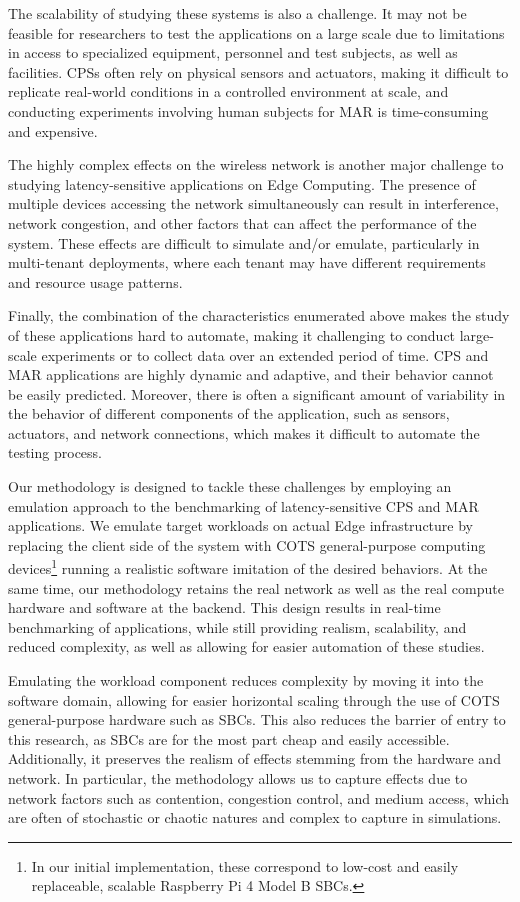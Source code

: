 The scalability of studying these systems is also a challenge.
It may not be feasible for researchers to test the applications on a large scale due to limitations in access to specialized equipment, personnel and test subjects, as well as facilities.
\glspl{CPS} often rely on physical sensors and actuators, making it difficult to replicate real-world conditions in a controlled environment at scale, and conducting experiments involving human subjects for \gls{MAR} is time-consuming and expensive.

The highly complex effects on the wireless network is another major challenge to studying latency-sensitive applications on Edge Computing.
The presence of multiple devices accessing the network simultaneously can result in interference, network congestion, and other factors that can affect the performance of the system.
These effects are difficult to simulate and/or emulate, particularly in multi-tenant deployments, where each tenant may have different requirements and resource usage patterns.

Finally, the combination of the characteristics enumerated above makes the study of these applications hard to automate, making it challenging to conduct large-scale experiments or to collect data over an extended period of time.
\gls{CPS} and \gls{MAR} applications are highly dynamic and adaptive, and their behavior cannot be easily predicted.
Moreover, there is often a significant amount of variability in the behavior of different components of the application, such as sensors, actuators, and network connections, which makes it difficult to automate the testing process.

Our methodology is designed to tackle these challenges by employing an emulation approach to the benchmarking of latency-sensitive \gls{CPS} and \gls{MAR} applications. 
We emulate target workloads on actual Edge infrastructure by replacing the client side of the system with \gls{COTS} general-purpose computing devices\footnote{%
    In our initial implementation, these correspond to low-cost and easily replaceable, scalable Raspberry Pi 4 Model B \acsp{SBC}.
} running a realistic software imitation of the desired behaviors.
At the same time, our methodology retains the real network as well as the real compute hardware and software at the backend.
This design results in real-time benchmarking of applications, while still providing realism, scalability, and reduced complexity, as well as allowing for easier automation of these studies.

Emulating the workload component reduces complexity by moving it into the software domain, allowing for easier horizontal scaling through the use of \gls{COTS} general-purpose hardware such as \glspl{SBC}.
This also reduces the barrier of entry to this research, as \glspl{SBC} are for the most part cheap and easily accessible.
Additionally, it preserves the realism of effects stemming from the hardware and network.
In particular, the methodology allows us to capture effects due to network factors such as contention, congestion control, and medium access, which are often of stochastic or chaotic natures and complex to capture in simulations.


